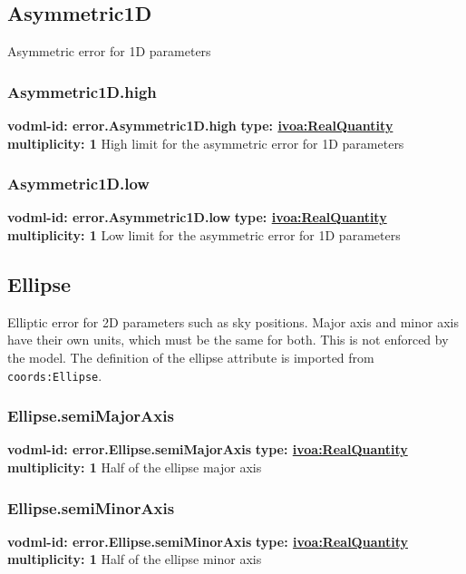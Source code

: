   \subsection{Asymmetric1D}
    \label{sect:error.Asymmetric1D}
    Asymmetric error for 1D parameters

    \subsubsection{Asymmetric1D.high}
    \textbf{vodml-id: error.Asymmetric1D.high} \newline
    \textbf{type: \hyperref[sect:ivoa]{ivoa:RealQuantity}} \newline
    \textbf{multiplicity: 1} \newline
    High limit for the asymmetric error for 1D parameters

    \subsubsection{Asymmetric1D.low}
    \textbf{vodml-id: error.Asymmetric1D.low} \newline
    \textbf{type: \hyperref[sect:ivoa]{ivoa:RealQuantity}} \newline
    \textbf{multiplicity: 1} \newline
    Low limit for the asymmetric error for 1D parameters

  \subsection{Ellipse}
    \label{sect:error.Ellipse}
    Elliptic error for 2D parameters such as sky positions. Major axis and minor axis have their own units, which must be the same for both. This is not enforced by the model. The definition of the ellipse attribute is imported from \texttt{coords:Ellipse}.

    \subsubsection{Ellipse.semiMajorAxis}
    \textbf{vodml-id: error.Ellipse.semiMajorAxis} \newline
    \textbf{type: \hyperref[sect:ivoa]{ivoa:RealQuantity}} \newline
    \textbf{multiplicity: 1} \newline
    Half of the ellipse major axis

    \subsubsection{Ellipse.semiMinorAxis}
    \textbf{vodml-id: error.Ellipse.semiMinorAxis} \newline
    \textbf{type: \hyperref[sect:ivoa]{ivoa:RealQuantity}} \newline
    \textbf{multiplicity: 1} \newline
    Half of the ellipse minor axis

